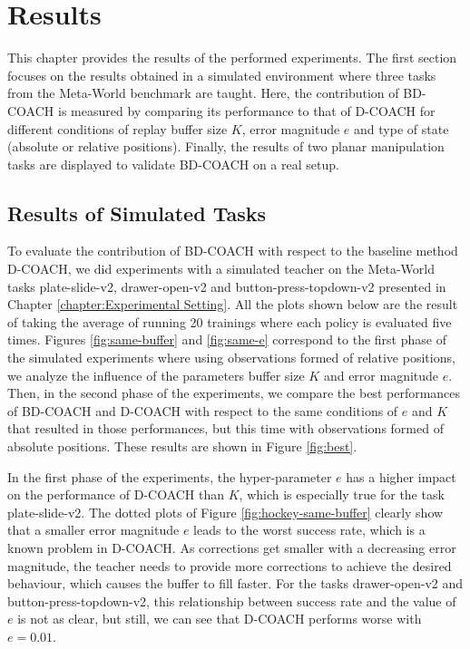


\chapter{Results}
\label{chapter:Results}

This chapter provides the results of the performed experiments. The first section focuses on the results obtained in a simulated environment where three tasks from the Meta-World benchmark \cite{metaworld} are taught. Here, the contribution of BD-COACH is measured by comparing its performance to that of D-COACH for different conditions of replay buffer size $K$, error magnitude $e$ and type of state (absolute or relative positions). Finally, the results of two planar manipulation tasks are displayed to validate BD-COACH on a real setup.



\section{Results of Simulated Tasks}
\label{section:results_metaworld}




To evaluate the contribution of BD-COACH with respect to the baseline method D-COACH, we did experiments with a simulated teacher on the Meta-World tasks plate-slide-v2, drawer-open-v2 and button-press-topdown-v2 presented in Chapter \ref{chapter:Experimental Setting}. All the plots shown below are the result of taking the average of running 20 trainings where each policy is evaluated five times. Figures \ref{fig:same-buffer} and \ref{fig:same-e} correspond to the first phase of the simulated experiments where using observations formed of relative positions, we analyze the influence of the parameters buffer size $K$ and error magnitude $e$. Then, in the second phase of the experiments, we compare the best performances of BD-COACH and D-COACH with respect to the same conditions of $e$ and $K$ that resulted in those performances, but this time with observations formed of absolute positions. These results are shown in Figure \ref{fig:best}.



In the first phase of the experiments, the hyper-parameter $e$ has a higher impact on the performance of D-COACH than $K$, which is especially true for the task plate-slide-v2. The dotted plots of Figure \ref{fig:hockey-same-buffer} clearly show that a smaller error magnitude $e$ leads to the worst success rate, which is a known problem in D-COACH. As corrections get smaller with a decreasing error magnitude, the teacher needs to provide more corrections to achieve the desired behaviour, which causes the buffer to fill faster. For the tasks drawer-open-v2 and button-press-topdown-v2, this relationship between success rate and the value of $e$ is not as clear, but still, we can see that D-COACH  performs worse with $e=0.01$.

